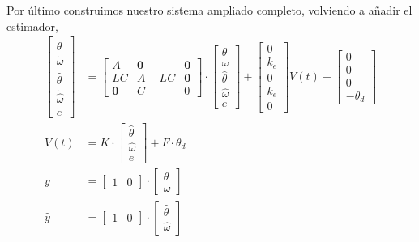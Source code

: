 \documentclass[10pt,a4paper]{report}
\begin{document}
Por último construimos nuestro sistema ampliado completo, volviendo a añadir el estimador,
\begin{align}
\begin{bmatrix}
\dot{\theta}\\
\dot{\omega}\\
\dot{\hat{\theta}}\\
\dot{\hat{\omega}}\\
\dot{e}
\end{bmatrix} &= \begin{bmatrix}
A & \mathbf{0} & \mathbf{0}\\
LC & A-LC & \mathbf{0}\\
\mathbf{0} & C & 0
\end{bmatrix}\cdot\begin{bmatrix}
\theta\\
\omega\\
\hat{\theta}\\
\hat{\omega}\\
e 
\end{bmatrix}+\begin{bmatrix}
0\\
k_e\\
0\\
k_e\\
0
\end{bmatrix}V(t)+ \begin{bmatrix}
0\\
0\\
0\\
-\theta_d
\end{bmatrix}\\ \label{eq513}
V(t) &= K\cdot\begin{bmatrix}
\hat{\theta}\\
\hat{\omega}\\
e
\end{bmatrix}+ F\cdot \theta_d\\
y &= \begin{bmatrix}
1& 0
\end{bmatrix}\cdot\begin{bmatrix}
\theta\\
\omega
\end{bmatrix}\\
\hat{y} &= \begin{bmatrix}
1& 0
\end{bmatrix}\cdot\begin{bmatrix}
\hat{\theta}\\
\hat{\omega}
\end{bmatrix} \label{eq516}
\end{align}
\end{document}
